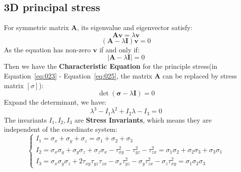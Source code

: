 \documentclass[en,hazy,cyan,8pt,normal]{elegantnote}
\begin{document}
  \subsection{3D principal stress}
    For symmetric matrix $\mathbf{A}$, its eigenvalue and eigenvector satisfy:
    \begin{equation}\label{eq:023}
      \mathbf{A}\mathbf{v}=\lambda \mathbf{v}
    \end{equation}
    \begin{equation}\label{eq:024}
      (\mathbf{A}-\lambda \mathbf{I})\mathbf{v}=0
    \end{equation}
    As the equation has non-zero $\mathbf{v}$ if and only if:
    \begin{equation}\label{eq:025}
      |\mathbf{A}-\lambda \mathbf{I}|=0
    \end{equation}
    Then we have the \textbf{Characteristic Equation} for the principle stress(in Equation~\ref{eq:023} - Equation~\ref{eq:025}, the matrix $\mathbf{A}$ can be replaced by stress matrix $[\sigma]$):
    \begin{equation}\label{eq:026}
      \det(\mathbf{\sigma}-\lambda \mathbf{I})=0
    \end{equation}
    Expand the determinant, we have:
    \begin{equation}\label{eq:027}
      \lambda^3 - I_1 \lambda^2 + I_2 \lambda - I_3 = 0
    \end{equation}
    The invariants $I_1, I_2, I_3$ are \textbf{Stress Invariants}, which means they are independent of the coordinate system:
    \begin{equation}\label{eq:028}
      \begin{cases}
        I_1 = \sigma_x + \sigma_y + \sigma_z=\sigma_1 + \sigma_2 + \sigma_3\\
        I_2 = \sigma_x \sigma_y + \sigma_y \sigma_z + \sigma_z \sigma_x - \tau_{xy}^2 - \tau_{yz}^2 - \tau_{zx}^2 = \sigma_1 \sigma_2 + \sigma_2 \sigma_3 + \sigma_3 \sigma_1\\
        I_3 = \sigma_x \sigma_y \sigma_z + 2 \tau_{xy} \tau_{yz} \tau_{zx} - \sigma_x \tau_{yz}^2 - \sigma_y \tau_{zx}^2 - \sigma_z \tau_{xy}^2 = \sigma_1 \sigma_2 \sigma_3
      \end{cases}
    \end{equation}
\end{document}
